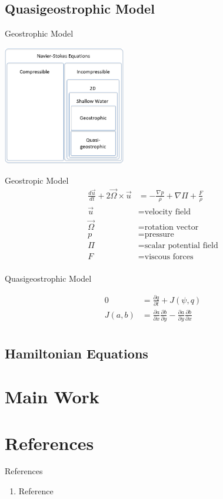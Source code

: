 \documentclass{beamer}
\begin{document}
		\subsection{Quasigeostrophic Model}
			\begin{frame}[t]{Geostrophic Model}
				\begin{center}
					\includegraphics[width=0.4\textwidth]{nested_models_qg.png}
				\end{center}
			\end{frame}
			\begin{frame}[t]{Geostropic Model}
				\begin{align*}
					\frac{d \vec u}{dt} + 2 \vec \Omega \times \vec u &= -\frac{\nabla p}{\rho} + \nabla \Pi + \frac{F}{\rho}\\
					\vec u &= \text{velocity field}\\
					\vec \Omega &= \text{rotation vector}\\
					p &= \text{pressure}\\
					\Pi &= \text{scalar potential field}\\
					F &= \text{viscous forces}\\
				\end{align*}
			\end{frame}
			\begin{frame}[t]{Quasigeostrophic Model}
				\begin{center}
					\begin{align*}
						0 &=\frac{\partial q}{\partial t} + J(\psi, q) \\
						J(a, b) &=\frac{\partial a}{\partial x}\frac{\partial b}{\partial y} - \frac{\partial a}{\partial y}\frac{\partial b}{\partial x} \\
					\end{align*}
				\end{center}
			\end{frame}
		\subsection{Hamiltonian Equations}

	\section{Main Work}

	\section{References}
		\begin{frame}{References}
			\begin{enumerate}
				\item Reference
			\end{enumerate}
		\end{frame}
\end{document}
